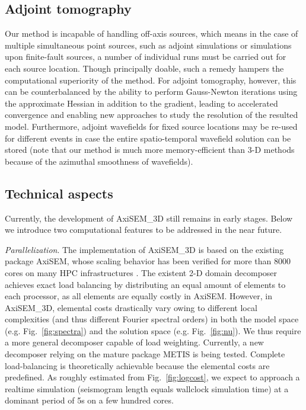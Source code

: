 \documentclass[extra,referee]{gji}
\begin{document}
\subsection{Adjoint tomography}
Our method is incapable of handling off-axis sources, which means
in the case of multiple simultaneous point sources, such as adjoint
simulations \cite[]{tromp2008spectral, liu2008finite} or simulations upon 
finite-fault sources, a number of individual runs must be carried out for 
each source location. 
Though principally doable, such a remedy hampers the computational superiority of the method. 
For adjoint tomography, however, this can be counterbalanced by the 
ability to perform Gauss-Newton iterations using the approximate Hessian 
\cite[Chap 10,][]{nocedal2006numerical} in addition to the gradient, 
leading to accelerated convergence and enabling new approaches to study the 
resolution of the resulted model. Furthermore, 
adjoint wavefields for fixed source locations may be re-used for different events 
in case the entire spatio-temporal wavefield solution can be stored (note that
our method is much more memory-efficient than 3-D methods
because of the azimuthal smoothness of wavefields). 

\subsection{Technical aspects}
Currently, the development of AxiSEM\_3D still remains in early
stages. Below we introduce two computational features to be addressed 
in the near future.

\textit{Parallelization}.
The implementation of AxiSEM\_3D is based on the existing 
package AxiSEM, whose scaling behavior has been verified for more than 
8000 cores on many HPC infrastructures \cite[]{nissen2014axisem}. 
The existent 2-D domain decomposer achieves exact load balancing 
by distributing an equal amount of elements to each
processor, as all elements are equally costly in AxiSEM.
However, in AxiSEM\_3D, elemental costs drastically vary 
owing to different local complexities (and thus different Fourier spectral orders) 
in both the model space 
(e.g. Fig.~\ref{fig:spectra}) and the solution space (e.g. Fig.~\ref{fig:nu}).
We thus require a more general decomposer capable of load weighting.
Currently, a new decomposer relying on the mature package 
METIS \cite[]{lasalle2015efficient} is being tested. 
Complete load-balancing is theoretically achievable because 
the elemental costs are predefined.
As roughly estimated from Fig.~\ref{fig:logcost},
we expect to approach a realtime simulation 
(seismogram length equals wallclock simulation time)
at a dominant period of 5s on a few hundred cores.
\end{document}
